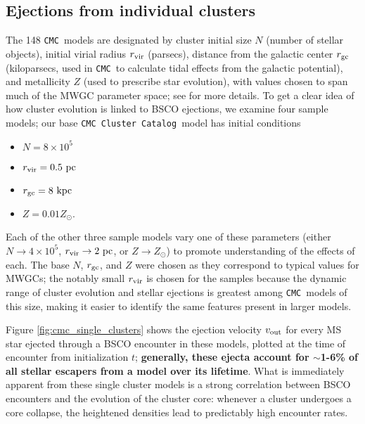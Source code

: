 \documentclass[twocolumn]{aastex631}
\newcommand{\CMC}{\texttt{CMC}}
\newcommand{\CMCcat}{\texttt{CMC Cluster Catalog}}
\begin{document}
\subsection{Ejections from individual clusters} \label{subsec:single_clusters}

The 148 \CMC\ models are designated by cluster initial size $N$ (number of stellar objects), initial virial radius $r_{\rm vir}$ (parsecs), distance from the galactic center $r_{\rm gc}$ (kiloparsecs, used in \CMC\ to calculate tidal effects from the galactic potential), and metallicity $Z$ (used to prescribe star evolution), with values chosen to span much of the MWGC parameter space; see \citet{2020IAUS..351..357K} for more details.
To get a clear idea of how cluster evolution is linked to BSCO ejections, we examine four sample models; our base \CMCcat\ model has initial conditions
\begin{itemize}
    \item $N = 8 \times 10^5$
    \item $r_{\rm vir} = 0.5~{\rm pc}$
    \item $r_{\rm gc} = 8~{\rm kpc}$
    \item $Z = 0.01Z_\odot$.
\end{itemize}
Each of the other three sample models vary one of these parameters (either $N \to 4 \times 10^5$, $r_{\rm vir} \to 2~{\rm pc}$, or $Z \to Z_\odot$) to promote understanding of the effects of each.
The base $N$, $r_{\rm gc}$, and $Z$ were chosen as they correspond to typical values for MWGCs; the notably small $r_{\rm vir}$ is chosen for the samples because the dynamic range of cluster evolution and stellar ejections is greatest among \CMC\ models of this size, making it easier to identify the same features present in larger models.

Figure \ref{fig:cmc_single_clusters} shows the ejection velocity $v_{\rm out}$ for every MS star ejected through a BSCO encounter in these models, plotted at the time of encounter from initialization $t$; \textbf{generally, these ejecta account for $\sim$1-6\% of all stellar escapers from a model over its lifetime}.
What is immediately apparent from these single cluster models is a strong correlation between BSCO encounters and the evolution of the cluster core: whenever a cluster undergoes a core collapse, the heightened densities lead to predictably high encounter rates.
\end{document}
